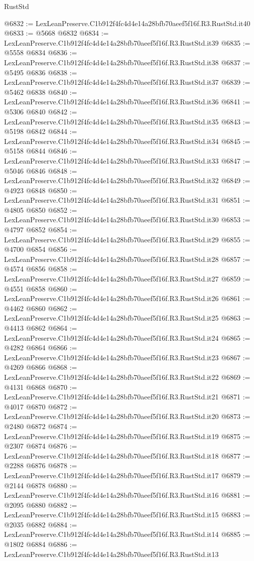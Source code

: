 \begin{lexlean}{RustStd}
\begin{coremodule}
@6832 := LexLeanPreserve.C1b912f4fc4d4e14a28bfb70aeef5f16f.R3.RustStd.it40
@6833 := @5668 @6832
@6834 := LexLeanPreserve.C1b912f4fc4d4e14a28bfb70aeef5f16f.R3.RustStd.it39
@6835 := @5558 @6834
@6836 := LexLeanPreserve.C1b912f4fc4d4e14a28bfb70aeef5f16f.R3.RustStd.it38
@6837 := @5495 @6836
@6838 := LexLeanPreserve.C1b912f4fc4d4e14a28bfb70aeef5f16f.R3.RustStd.it37
@6839 := @5462 @6838
@6840 := LexLeanPreserve.C1b912f4fc4d4e14a28bfb70aeef5f16f.R3.RustStd.it36
@6841 := @5306 @6840
@6842 := LexLeanPreserve.C1b912f4fc4d4e14a28bfb70aeef5f16f.R3.RustStd.it35
@6843 := @5198 @6842
@6844 := LexLeanPreserve.C1b912f4fc4d4e14a28bfb70aeef5f16f.R3.RustStd.it34
@6845 := @5158 @6844
@6846 := LexLeanPreserve.C1b912f4fc4d4e14a28bfb70aeef5f16f.R3.RustStd.it33
@6847 := @5046 @6846
@6848 := LexLeanPreserve.C1b912f4fc4d4e14a28bfb70aeef5f16f.R3.RustStd.it32
@6849 := @4923 @6848
@6850 := LexLeanPreserve.C1b912f4fc4d4e14a28bfb70aeef5f16f.R3.RustStd.it31
@6851 := @4805 @6850
@6852 := LexLeanPreserve.C1b912f4fc4d4e14a28bfb70aeef5f16f.R3.RustStd.it30
@6853 := @4797 @6852
@6854 := LexLeanPreserve.C1b912f4fc4d4e14a28bfb70aeef5f16f.R3.RustStd.it29
@6855 := @4700 @6854
@6856 := LexLeanPreserve.C1b912f4fc4d4e14a28bfb70aeef5f16f.R3.RustStd.it28
@6857 := @4574 @6856
@6858 := LexLeanPreserve.C1b912f4fc4d4e14a28bfb70aeef5f16f.R3.RustStd.it27
@6859 := @4551 @6858
@6860 := LexLeanPreserve.C1b912f4fc4d4e14a28bfb70aeef5f16f.R3.RustStd.it26
@6861 := @4462 @6860
@6862 := LexLeanPreserve.C1b912f4fc4d4e14a28bfb70aeef5f16f.R3.RustStd.it25
@6863 := @4413 @6862
@6864 := LexLeanPreserve.C1b912f4fc4d4e14a28bfb70aeef5f16f.R3.RustStd.it24
@6865 := @4282 @6864
@6866 := LexLeanPreserve.C1b912f4fc4d4e14a28bfb70aeef5f16f.R3.RustStd.it23
@6867 := @4269 @6866
@6868 := LexLeanPreserve.C1b912f4fc4d4e14a28bfb70aeef5f16f.R3.RustStd.it22
@6869 := @4131 @6868
@6870 := LexLeanPreserve.C1b912f4fc4d4e14a28bfb70aeef5f16f.R3.RustStd.it21
@6871 := @4017 @6870
@6872 := LexLeanPreserve.C1b912f4fc4d4e14a28bfb70aeef5f16f.R3.RustStd.it20
@6873 := @2480 @6872
@6874 := LexLeanPreserve.C1b912f4fc4d4e14a28bfb70aeef5f16f.R3.RustStd.it19
@6875 := @2307 @6874
@6876 := LexLeanPreserve.C1b912f4fc4d4e14a28bfb70aeef5f16f.R3.RustStd.it18
@6877 := @2288 @6876
@6878 := LexLeanPreserve.C1b912f4fc4d4e14a28bfb70aeef5f16f.R3.RustStd.it17
@6879 := @2144 @6878
@6880 := LexLeanPreserve.C1b912f4fc4d4e14a28bfb70aeef5f16f.R3.RustStd.it16
@6881 := @2095 @6880
@6882 := LexLeanPreserve.C1b912f4fc4d4e14a28bfb70aeef5f16f.R3.RustStd.it15
@6883 := @2035 @6882
@6884 := LexLeanPreserve.C1b912f4fc4d4e14a28bfb70aeef5f16f.R3.RustStd.it14
@6885 := @1802 @6884
@6886 := LexLeanPreserve.C1b912f4fc4d4e14a28bfb70aeef5f16f.R3.RustStd.it13

\end{coremodule}
\end{lexlean}
